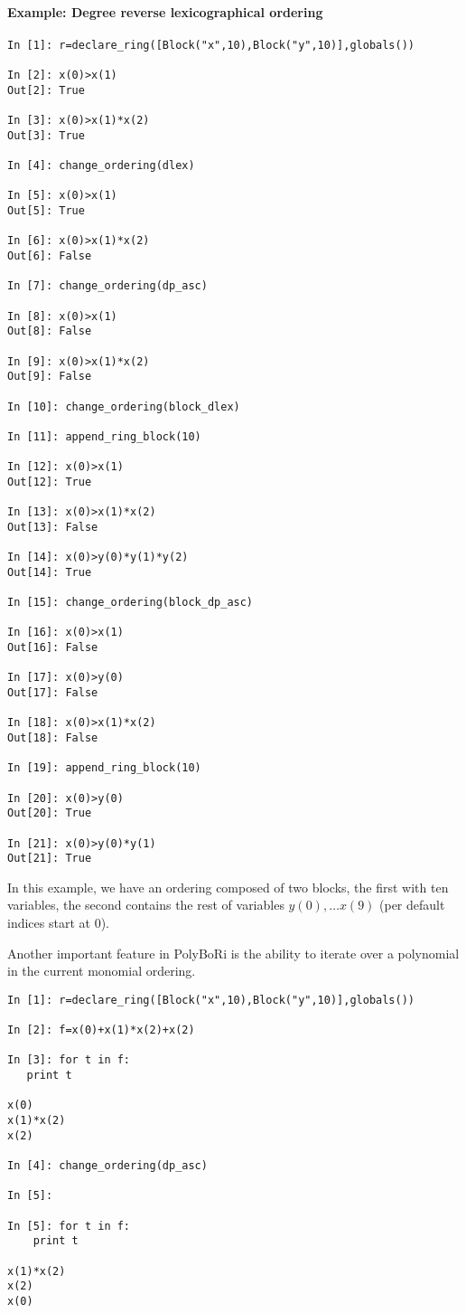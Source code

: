 \documentclass[]{article}
\newcommand{\PolyBoRi}{{\sc PolyBoRi}\xspace}
\begin{document}
\paragraph{Example: Degree reverse lexicographical ordering}
\begin{verbatim}
In [1]: r=declare_ring([Block("x",10),Block("y",10)],globals())

In [2]: x(0)>x(1)
Out[2]: True

In [3]: x(0)>x(1)*x(2)
Out[3]: True

In [4]: change_ordering(dlex)

In [5]: x(0)>x(1)
Out[5]: True

In [6]: x(0)>x(1)*x(2)
Out[6]: False

In [7]: change_ordering(dp_asc)

In [8]: x(0)>x(1)
Out[8]: False

In [9]: x(0)>x(1)*x(2)
Out[9]: False

In [10]: change_ordering(block_dlex)

In [11]: append_ring_block(10)

In [12]: x(0)>x(1)
Out[12]: True

In [13]: x(0)>x(1)*x(2)
Out[13]: False

In [14]: x(0)>y(0)*y(1)*y(2)
Out[14]: True

In [15]: change_ordering(block_dp_asc)

In [16]: x(0)>x(1)
Out[16]: False

In [17]: x(0)>y(0)
Out[17]: False

In [18]: x(0)>x(1)*x(2)
Out[18]: False

In [19]: append_ring_block(10)

In [20]: x(0)>y(0)
Out[20]: True

In [21]: x(0)>y(0)*y(1)
Out[21]: True
\end{verbatim}
In this example, we have an ordering composed of two blocks, the first with ten variables, the second contains the rest of variables $y(0), \ldots x(9)$ (per default indices start at 0).

Another important feature in \PolyBoRi is the ability to iterate over a polynomial in the current monomial ordering.

\begin{verbatim}
In [1]: r=declare_ring([Block("x",10),Block("y",10)],globals())

In [2]: f=x(0)+x(1)*x(2)+x(2)

In [3]: for t in f:
   print t
   
x(0)
x(1)*x(2)
x(2)

In [4]: change_ordering(dp_asc)

In [5]: 

In [5]: for t in f:
    print t

x(1)*x(2)
x(2)
x(0)
\end{verbatim}
\end{document}
